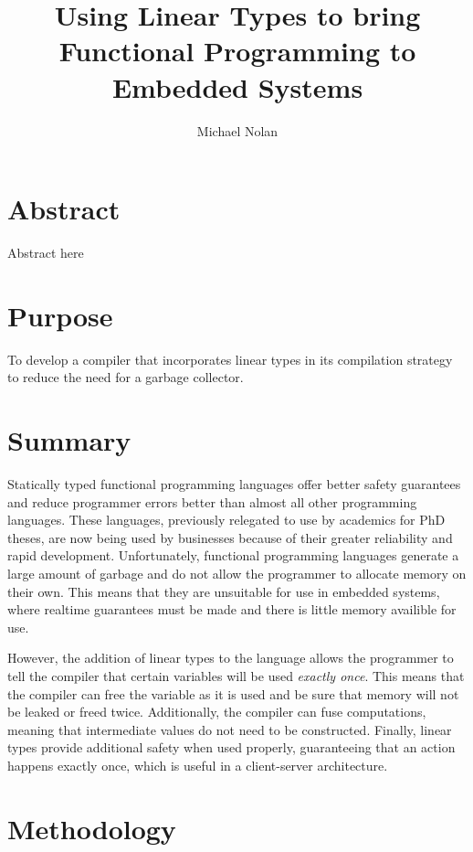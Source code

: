 \documentclass{article}
\title{Using Linear Types to bring Functional Programming to Embedded Systems}
\author{Michael Nolan}
\begin{document}
\maketitle
\tableofcontents
\newpage
\section{Abstract}
Abstract here
\section{Purpose}
To develop a compiler that incorporates linear types in its compilation strategy to 
reduce the need for a garbage collector.
\section{Summary}

Statically typed functional programming languages offer better safety
guarantees and reduce programmer errors better than almost all other
programming languages. These languages, previously relegated to use by
academics for PhD theses, are now being used by businesses because of their
greater reliability and rapid development. Unfortunately, functional
programming languages generate a large amount of garbage and do not allow the
programmer to allocate memory on their own. This means that they are unsuitable
for use in embedded systems, where realtime guarantees must be made and there
is little memory availible for use. 

However, the addition of linear types\cite{girard} to the language allows the
programmer to tell the compiler that certain variables will be used
\textit{exactly once}. This means that the compiler can free the variable as it
is used and be sure that memory will not be leaked or freed twice. Additionally, 
the compiler can fuse computations\cite{ghc-linear,tweag-blog}, meaning that intermediate
values do not need to be constructed. Finally, linear types provide additional safety
when used properly, guaranteeing that an action happens exactly once, which is useful
in a client-server architecture.

\section{Methodology}
\newpage


\end{document}

